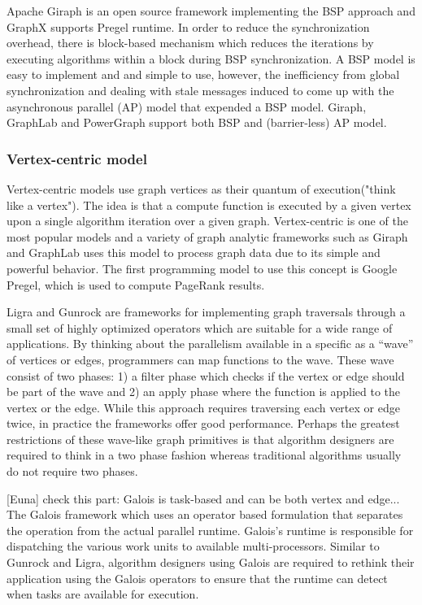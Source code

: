Apache Giraph\cite{giraph} is an open source framework implementing the BSP approach and GraphX\cite{xin2013graphx} supports Pregel runtime. In order to reduce the synchronization overhead, there is block-based mechanism which reduces the iterations by executing algorithms within a block during BSP synchronization. A BSP model is easy to implement and and simple to use, however, the inefficiency from global synchronization and dealing with stale messages induced to come up with the asynchronous parallel (AP) model that expended a BSP model. Giraph\cite{giraph}, GraphLab\cite{Low:2012:DGF:2212351.2212354} and PowerGraph\cite{powergraph} support both BSP and (barrier-less) AP model.

\subsubsection{Vertex-centric model}
\label{subsub:vertex}
Vertex-centric models use graph vertices as their quantum of execution("think like a vertex"). The idea is that a compute function is executed by a given vertex upon a single algorithm iteration over a given graph. Vertex-centric is one of the most popular models and a variety of graph analytic frameworks such as Giraph and GraphLab uses this model to process graph data due to its simple and powerful behavior\cite{Satish:2014:NMG:2588555.2610518}. 
The first programming model to use this concept is Google Pregel, which is used to compute PageRank results.

Ligra\cite{shun2013ligra} and Gunrock\cite{wang2015gunrock} are frameworks for implementing graph traversals through a small set of highly optimized operators which are suitable for a wide range of applications. By thinking about the parallelism available in a specific as a ``wave'' of vertices or edges, programmers can map functions to the wave. These wave consist of two phases: 1) a filter phase which checks if the vertex or edge should be part of the wave and 2) an apply phase where the function is applied to the vertex or the edge. While this approach requires traversing each vertex or edge twice, in practice the frameworks offer good performance. Perhaps the greatest restrictions of these wave-like graph primitives is that algorithm designers are required to think in a two phase fashion whereas traditional algorithms usually do not require two phases.

[Euna] check this part: Galois is task-based and can be both vertex and edge... 
The Galois framework\cite{pingali2011tao} %
which uses an operator based formulation that separates the operation from the actual parallel runtime. Galois’s runtime is responsible for dispatching the various work units to available multi-processors. Similar to Gunrock and Ligra, algorithm designers using Galois are required to rethink their application using the Galois operators to ensure that the runtime can detect when tasks are available for execution.

